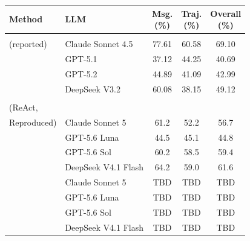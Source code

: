 \documentclass{article}
\newcommand{\benchmarkstacksep}{\vspace{5pt}}
\newcommand{\method}{\textsc{Ours}}
\newcommand{\headpct}{(\%)}
\newcommand{\tabmethodreported}[1]{\makecell[l]{#1\\(reported)}}
\newcommand{\tabmethodbaseline}{\makecell[l]{Baseline\\(ReAct,\\Reproduced)}}
\begin{document}
\begin{table}[t]
  \benchmarkstacksep

  \begin{minipage}[t]{0.48\textwidth}
    \centering
    \label{tab:ddr-matrix}
    \scriptsize
    \setlength{\tabcolsep}{2.5pt}
    \begin{tabular}{@{}>{\raggedright\arraybackslash}l>{\raggedright\arraybackslash}lccc@{}}
      \toprule
      Method & LLM & \makecell{Msg.\\\headpct} & \makecell{Traj.\\\headpct} & \makecell{Overall\\\headpct} \\
      \midrule
      \multirow{4}{*}{\tabmethodreported{ReAct}} & Claude Sonnet 4.5 & 77.61 & 60.58 & 69.10 \\
        & GPT-5.1 & 37.12 & 44.25 & 40.69 \\
        & GPT-5.2 & 44.89 & 41.09 & 42.99 \\
        & DeepSeek V3.2 & 60.08 & 38.15 & 49.12 \\
      \midrule
      \multirow{4}{*}{\tabmethodbaseline}
        & Claude Sonnet 5 & 61.2 & 52.2 & 56.7 \\
        & GPT-5.6 Luna & 44.5 & 45.1 & 44.8 \\
        & GPT-5.6 Sol & 60.2 & 58.5 & 59.4 \\
        & DeepSeek V4.1 Flash & 64.2 & 59.0 & 61.6 \\
      \midrule
      \multirow{4}{*}{\method{}}
        & Claude Sonnet 5 & TBD & TBD & TBD \\
        & GPT-5.6 Luna & TBD & TBD & TBD \\
        & GPT-5.6 Sol & TBD & TBD & TBD \\
        & DeepSeek V4.1 Flash & TBD & TBD & TBD \\
      \bottomrule
    \end{tabular}

\end{minipage}
\end{table}
\end{document}
